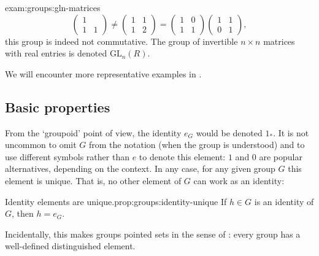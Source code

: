 \begin{exam}{}{exam:groups:gln-matrices}
\[\begin{pmatrix}
      1 \\ 1 & 1 \end{pmatrix} \neq
    \begin{pmatrix} 1 & 1 \\ 1 & 2 \end{pmatrix} =
    \begin{pmatrix} 1 & 0 \\ 1 & 1 \end{pmatrix}
    \begin{pmatrix} 1 & 1 \\ 0 & 1 \end{pmatrix},
  \]
  this group is indeed not commutative. The group of invertible
  $n \times n$ matrices with real entries is denoted
  $\mathrm{GL}_n(R)$.
\end{exam}

We will encounter more representative examples in
.

\subsection{Basic properties}
\label{subsec:groups:basic-properties}
From the `groupoid' point of view, the identity $e_G$ would be denoted
$1_*$.  It is not uncommon to omit $G$ from the notation (when the
group is understood) and to use different symbols rather than $e$ to
denote this element: $1$ and $0$ are popular alternatives, depending
on the context. In any case, for any given group $G$ this element is
unique. That is, no other element of $G$ can work as an identity:

\begin{prop}{Identity elements are unique.}{prop:groups:identity-unique}
  If $h \in G$ is an identity of $G$, then $h = e_G$.
\end{prop}
Incidentally, this makes groups pointed sets in the sense of
: every group has a well-defined
distinguished element.

